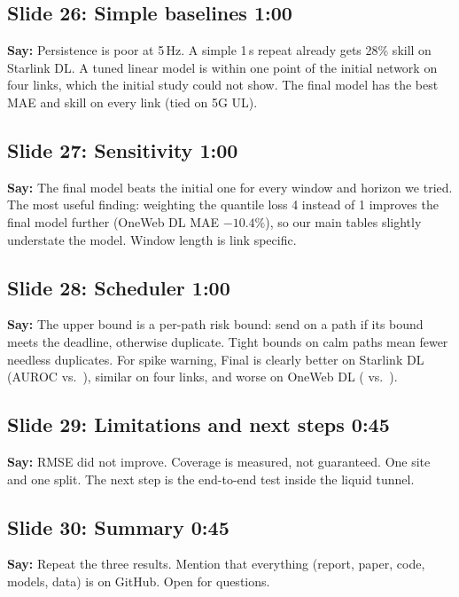 \documentclass[11pt]{article}
\newcommand{\slide}[3]{\subsection*{Slide #1: #2 \hfill{\normalsize\color{gray}#3}}}
\newcommand{\say}{\textbf{Say:} }
\begin{document}
\slide{26}{Simple baselines}{1:00}
\say Persistence is poor at 5\,Hz. A simple 1\,s repeat already gets 28\% skill on Starlink DL. A tuned linear model is within one point of the initial network on four links, which the initial study could not show. The final model has the best MAE and skill on every link (tied on 5G UL).

\slide{27}{Sensitivity}{1:00}
\say The final model beats the initial one for every window and horizon we tried. The most useful finding: weighting the quantile loss 4 instead of 1 improves the final model further (OneWeb DL MAE $-10.4\%$), so our main tables slightly understate the model. Window length is link specific.

\slide{28}{Scheduler}{1:00}
\say The upper bound is a per-path risk bound: send on a path if its bound meets the deadline, otherwise duplicate. Tight bounds on calm paths mean fewer needless duplicates. For spike warning, Final is clearly better on Starlink DL (AUROC \AUCFRSLDL{} vs.\ \AUCPrevSLDL), similar on four links, and worse on OneWeb DL (\AUCFROWDL{} vs.\ \AUCPrevOWDL).

\slide{29}{Limitations and next steps}{0:45}
\say RMSE did not improve. Coverage is measured, not guaranteed. One site and one split. The next step is the end-to-end test inside the liquid tunnel.

\slide{30}{Summary}{0:45}
\say Repeat the three results. Mention that everything (report, paper, code, models, data) is on GitHub. Open for questions.
\end{document}
